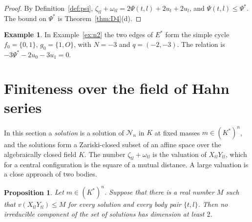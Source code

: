 \documentclass[11pt]{amsart}
\newtheorem{proposition}[theorem]{Proposition}
\theoremstyle{definition}
\newtheorem{example}[theorem]{Example}
\theoremstyle{remark}
\numberwithin{equation}{section}
\newcommand{\cN}{\mathcal{N}}
\newcommand{\Ps}{\Psi^{*}}
\newcommand{\Es}{E^{*}}
\begin{document}
\begin{proof}
By Definition~\ref{def:psi}, $\zeta_{tl} + \omega_{tl} = 2\Psi(t, l) + 2u_t + 2u_l$, and
$\Psi(t, l) \le \Ps$. The bound on $\Ps$ is Theorem~\ref{thm:D4}(d).
\end{proof}

\begin{example}\label{ex:n2cycle}
In Example~\ref{ex:n2} the two edges of $\Es$ form the simple cycle $f_0 = \{0, 1\}$, $g_0 = \{1, O\}$,
with $N = -3$ and $q = (-2, -3)$. The relation is $-3\Ps - 2u_0 - 3u_1 = 0$.
\end{example}

\section{Finiteness over the field of Hahn series}\label{sec:K}

In this section a \emph{solution} is a solution of $\cN_n$ in $K$ at fixed masses $m \in (K^{*})^n$, and
the solutions form a Zariski-closed subset of an affine space over the algebraically closed field $K$.
The number $\zeta_{tl} + \omega_{tl}$ is the valuation of $X_{tl} Y_{tl}$, which for a central
configuration is the square of a mutual distance. A large valuation is a close approach of two bodies.

\begin{proposition}\label{prop:D2}
Let $m \in (K^{*})^n$. Suppose that there is a real number $M$ such that
$v(X_{tl} Y_{tl}) \le M$ for every solution and every body pair $\{t, l\}$. Then no irreducible
component of the set of solutions has dimension at least $2$.
\end{proposition}
\end{document}
